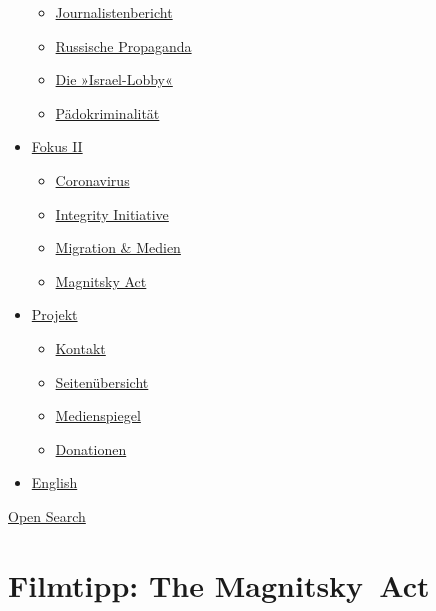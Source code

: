 \begin{itemize}
  \begin{itemize}
  \tightlist
  \item
    \href{https://swprs.org/bericht-eines-journalisten/}{Journalistenbericht}
  \item
    \href{https://swprs.org/russische-propaganda/}{Russische Propaganda}
  \item
    \href{https://swprs.org/die-israel-lobby-fakten-und-mythen/}{Die
    »Israel-Lobby«}
  \item
    \href{https://swprs.org/geopolitik-und-paedokriminalitaet/}{Pädokriminalität}
  \end{itemize}
\item
  \href{https://swprs.org/migration-und-medien/}{Fokus II}

  \begin{itemize}
  \tightlist
  \item
    \href{https://swprs.org/covid-19-hinweis-ii/}{Coronavirus}
  \item
    \href{https://swprs.org/die-integrity-initiative/}{Integrity
    Initiative}
  \item
    \href{https://swprs.org/migration-und-medien/}{Migration \& Medien}
  \item
    \href{https://swprs.org/der-fall-magnitsky/}{Magnitsky Act}
  \end{itemize}
\item
  \href{https://swprs.org/kontakt/}{Projekt}

  \begin{itemize}
  \tightlist
  \item
    \href{https://swprs.org/kontakt/}{Kontakt}
  \item
    \href{https://swprs.org/uebersicht/}{Seitenübersicht}
  \item
    \href{https://swprs.org/medienspiegel/}{Medienspiegel}
  \item
    \href{https://swprs.org/donationen/}{Donationen}
  \end{itemize}
\item
  \href{https://swprs.org/contact/}{English}
\end{itemize}

\protect\hyperlink{}{Open Search}

\hypertarget{filmtipp-the-magnitsky-act}{%
\section{Filmtipp: The Magnitsky~Act}\label{filmtipp-the-magnitsky-act}}

